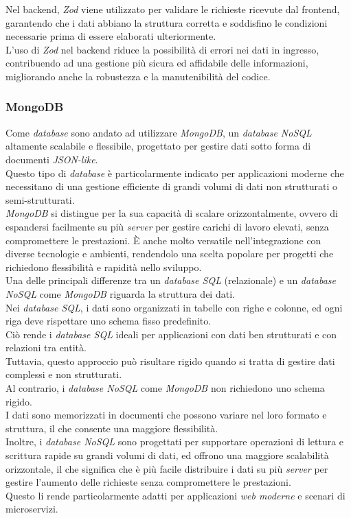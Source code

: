 \noindent Nel \gls{backend}, \textit{Zod} viene utilizzato per validare le richieste ricevute dal \gls{frontend}, garantendo che i dati abbiano la struttura corretta e soddisfino le condizioni necessarie prima di essere elaborati ulteriormente.\\
L'uso di \textit{Zod} nel \gls{backend} riduce la possibilità di errori nei dati in ingresso, contribuendo ad una gestione più sicura ed affidabile delle informazioni, migliorando anche la robustezza e la manutenibilità del codice.

\subsubsection{MongoDB}

Come \textit{database} sono andato ad utilizzare \textit{MongoDB}, un \textit{database NoSQL} altamente scalabile e flessibile, progettato per gestire dati sotto forma di documenti \textit{JSON-like}.\\
Questo tipo di \textit{database} è particolarmente indicato per applicazioni moderne che necessitano di una gestione efficiente di grandi volumi di dati non strutturati o semi-strutturati.\\
\textit{MongoDB} si distingue per la sua capacità di scalare orizzontalmente, ovvero di espandersi facilmente su più \textit{server}  per gestire carichi di lavoro elevati, senza compromettere le prestazioni. 
È anche molto versatile nell'integrazione con diverse tecnologie e ambienti, rendendolo una scelta popolare per progetti che richiedono flessibilità e rapidità nello sviluppo.\\

\noindent Una delle principali differenze tra un \textit{database SQL} (relazionale) e un \textit{database NoSQL} come \textit{MongoDB} riguarda la struttura dei dati.\\
Nei \textit{database SQL}, i dati sono organizzati in tabelle con righe e colonne, ed ogni riga deve rispettare uno schema fisso predefinito.\\
Ciò rende i \textit{database SQL} ideali per applicazioni con dati ben strutturati e con relazioni tra entità. \\
Tuttavia, questo approccio può risultare rigido quando si tratta di gestire dati complessi e non strutturati.\\

\noindent Al contrario, i \textit{database NoSQL} come \textit{MongoDB} non richiedono uno schema rigido. \\
I dati sono memorizzati in documenti che possono variare nel loro formato e struttura, il che consente una maggiore flessibilità.\\
Inoltre, i \textit{database NoSQL} sono progettati per supportare operazioni di lettura e scrittura rapide su grandi volumi di dati, ed offrono una maggiore scalabilità orizzontale,
il che significa che è più facile distribuire i dati su più \textit{server} per gestire l'aumento delle richieste senza compromettere le prestazioni.\\
Questo li rende particolarmente adatti per applicazioni \textit{web moderne} e scenari di microservizi.\\

